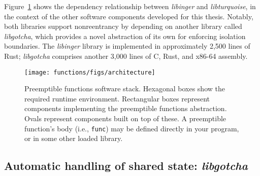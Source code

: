 Figure~\ref{fig:architecture} shows the dependency relationship between
\textit{libinger} and \textit{libturquoise}, in the context of the other software
components developed for this thesis.  Notably, both libraries support nonreentrancy
by depending on another library called \textit{libgotcha}, which provides a novel
abstraction of its own for enforcing isolation boundaries.  The \textit{libinger}
library is implemented in approximately 2,500 lines of Rust; \textit{libgotcha}
comprises another 3,000 lines of C, Rust, and x86-64 assembly.

\begin{figure}
\begin{center}
\texttt{[image: functions/figs/architecture]}
\end{center}
\caption{Preemptible functions software stack.  \textnormal{Hexagonal boxes show
the required runtime environment.  Rectangular boxes represent components
implementing the preemptible functions abstraction.  Ovals represent components built
on top of these.  A preemptible function's body (i.e., \texttt{func}) may be defined
directly in
your program, or in some other loaded library.}}
\label{fig:architecture}
\end{figure}


\subsection{Automatic handling of shared state: \textit{libgotcha}}

\begin{swallowsubsections}

\end{swallowsubsections}
